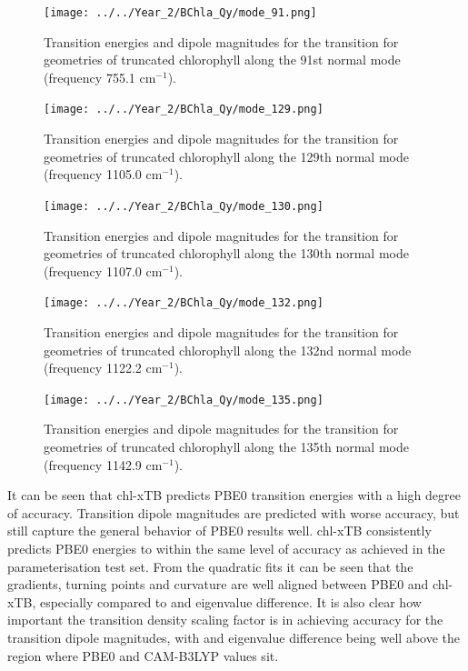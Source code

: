 \begin{figure}
    \centering
    \texttt{[image: ../../Year\_2/BChla\_Qy/mode\_91.png]}
    \caption{Transition energies and dipole magnitudes for the \Qy transition for
    geometries of truncated chlorophyll along the 91st normal mode (frequency 755.1
    $\text{cm}^{-1}$).}
    \label{fig:mode_91}
\end{figure}

\begin{figure}
    \centering
    \texttt{[image: ../../Year\_2/BChla\_Qy/mode\_129.png]}
    \caption{Transition energies and dipole magnitudes for the \Qy transition for
    geometries of truncated chlorophyll along the 129th normal mode (frequency 1105.0
    $\text{cm}^{-1}$).}
    \label{fig:mode_129}
\end{figure}

\begin{figure}
    \centering
    \texttt{[image: ../../Year\_2/BChla\_Qy/mode\_130.png]}
    \caption{Transition energies and dipole magnitudes for the \Qy transition for
    geometries of truncated chlorophyll along the 130th normal mode (frequency 1107.0
    $\text{cm}^{-1}$).}
    \label{fig:mode_130}
\end{figure}

\begin{figure}
    \centering
    \texttt{[image: ../../Year\_2/BChla\_Qy/mode\_132.png]}
    \caption{Transition energies and dipole magnitudes for the \Qy transition for
    geometries of truncated chlorophyll along the 132nd normal mode (frequency 1122.2
    $\text{cm}^{-1}$).}
    \label{fig:mode_132}
\end{figure}

\begin{figure}
    \centering
    \texttt{[image: ../../Year\_2/BChla\_Qy/mode\_135.png]}
    \caption{Transition energies and dipole magnitudes for the \Qy transition for
    geometries of truncated chlorophyll along the 135th normal mode (frequency 1142.9
    $\text{cm}^{-1}$).}
    \label{fig:mode_135}
\end{figure}

It can be seen that chl-xTB predicts PBE0 transition energies with a high degree
of accuracy. Transition dipole magnitudes are predicted with worse accuracy, but
still capture the general behavior of PBE0 results well. chl-xTB consistently 
predicts PBE0 energies to within the same level of accuracy as achieved in the 
parameterisation test set. From the quadratic fits it can be seen that the gradients, 
turning points and curvature are well aligned between PBE0 and chl-xTB, especially
compared to \dscf and eigenvalue difference. It is also clear how important the
transition density scaling factor is in achieving accuracy for the transition dipole
magnitudes, with \dscf and eigenvalue difference being well above the region where
PBE0 and CAM-B3LYP values sit.

